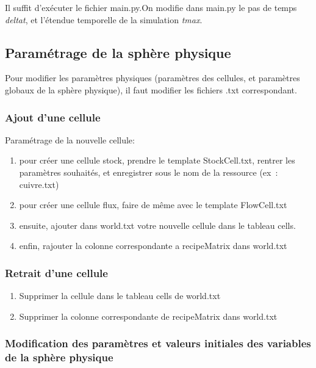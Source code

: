\documentclass[12pt,a4paper]{article}%
\begin{document}
Il suffit d'exécuter le fichier main.py.\newline On modifie dans main.py le
pas de temps \textit{deltat}, et l'étendue temporelle de la simulation
\textit{tmax}.

\subsection{Paramétrage de la sphère physique}

Pour modifier les paramètres physiques (paramètres des cellules, et
paramètres globaux de la sphère physique), il faut modifier les
fichiers .txt correspondant.

\subsubsection{Ajout d'une cellule}

Paramétrage de la nouvelle cellule:

\begin{enumerate}
\item pour créer une cellule stock, prendre le template StockCell.txt, rentrer
les paramètres souhaités, et enregistrer sous le nom de la ressource (ex~: cuivre.txt)

\item pour créer une cellule flux, faire de même avec le template FlowCell.txt

\item ensuite, ajouter dans world.txt votre nouvelle cellule dans le tableau cells.

\item enfin, rajouter la colonne correspondante a recipeMatrix dans world.txt
\end{enumerate}

\subsubsection{Retrait d'une cellule}

\begin{enumerate}
\item Supprimer la cellule dans le tableau cells de world.txt

\item Supprimer la colonne correspondante de recipeMatrix dans world.txt
\end{enumerate}

\subsubsection{Modification des paramètres et valeurs initiales des
variables de la sphère physique}
\end{document}
